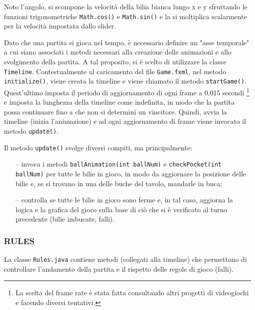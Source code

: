 \documentclass[12pt,a4paper]{report}
\begin{document}
Noto l'angolo, si scompone la velocità della bilia bianca lungo x e y sfruttando le funzioni trigonometriche \texttt{Math.cos()} e \texttt{Math.sin()} e la si moltiplica scalarmente per la velocità impostata dallo slider.

\vspace{3mm}

Dato che una partita si gioca nel tempo, è necessario definire un "asse temporale" a cui siano associati i metodi necessari alla creazione delle animazioni e allo svolgimento della partita.
A tal proposito, si è scelto di utilizzare la classe \texttt{Timeline}.
Contestualmente al caricamento del file \texttt{Game.fxml}, nel metodo \texttt{initialize()}, viene creata la timeline e viene chiamato il metodo \texttt{startGame()}.
Quest'ultimo imposta il periodo di aggiornamento di ogni frame a 0.015 secondi \footnote{La scelta del frame rate è stata fatta consultando altri progetti di videogiochi e facendo diversi tentativi.} e imposta la lunghezza della timeline come indefinita, in modo che la partita possa continuare fino a che non si determini un vincitore.
Quindi, avvia la timeline (inizia l'animazione) e ad ogni aggiornamento di frame viene invocato il metodo \texttt{update()}.

\vspace{3mm}

Il metodo \texttt{update()} svolge diversi compiti, ma principalmente:
\begin{itemize}
	\item [--] invoca i metodi \texttt{ballAnimation(int ballNum)} e \texttt{checkPocket(int ballNum)} per tutte le bilie in gioco, in modo da aggiornare la posizione delle bilie e, se si trovano in una delle buche del tavolo, mandarle in buca;
	\item [--] controlla se tutte le bilie in gioco sono ferme e, in tal caso, aggiorna la logica e la grafica del gioco sulla base di ciò che si è verificato al turno precedente (bilie imbucate, falli).
\end{itemize}

\subsubsection*{RULES}
La classe \texttt{Rules.java} contiene metodi (collegati alla timeline) che permettono di controllare l'andamento della partita e il rispetto delle regole di gioco (falli).

\vspace{3mm}
\end{document}
